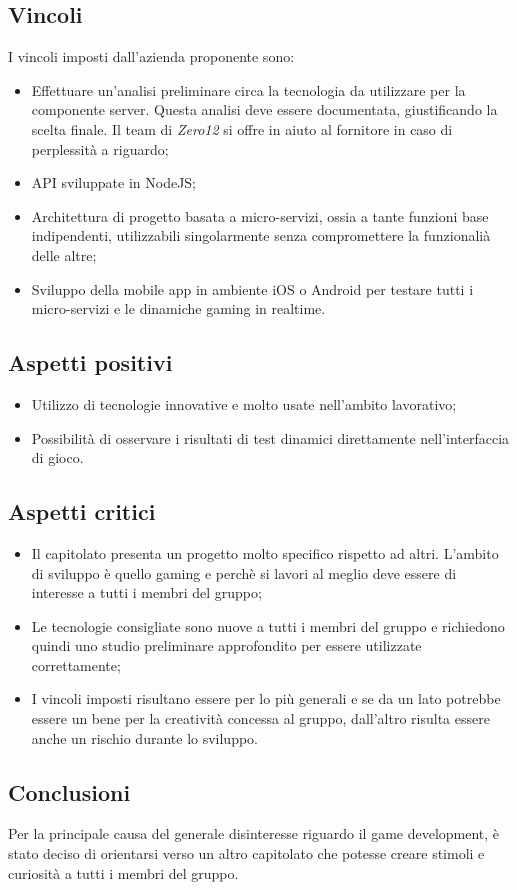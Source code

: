 \subsection{Vincoli}
I vincoli imposti dall'azienda proponente sono:
\begin{itemize}
\item Effettuare un'analisi preliminare circa la tecnologia da utilizzare per la componente server. Questa analisi deve essere documentata, giustificando la scelta finale. Il team di \textit{Zero12} si offre in aiuto al fornitore in caso di perplessità a riguardo;
\item API sviluppate in NodeJS;
\item Architettura di progetto basata a micro-servizi, ossia a tante funzioni base indipendenti, utilizzabili singolarmente senza compromettere la funzionalià delle altre;
\item Sviluppo della mobile app in ambiente iOS o Android per testare tutti i micro-servizi e le dinamiche gaming in realtime. 
\end{itemize}

\subsection{Aspetti positivi}
\begin{itemize}
\item Utilizzo di tecnologie innovative e molto usate nell'ambito lavorativo;
\item Possibilità di osservare i risultati di test dinamici direttamente nell'interfaccia di gioco.
\end{itemize}

\subsection{Aspetti critici}
\begin{itemize}
\item Il capitolato presenta un progetto molto specifico rispetto ad altri. L'ambito di sviluppo è quello gaming e perchè si lavori al meglio deve essere di interesse a tutti i membri del gruppo;
\item Le tecnologie consigliate sono nuove a tutti i membri del gruppo e richiedono quindi uno studio preliminare approfondito per essere utilizzate correttamente;
\item I vincoli imposti risultano essere per lo più generali e se da un lato potrebbe essere un bene per la creatività concessa al gruppo, dall'altro risulta essere anche un rischio durante lo sviluppo. 
\end{itemize}

\subsection{Conclusioni}
Per la principale causa del generale disinteresse riguardo il game development, è stato deciso di orientarsi verso un altro capitolato che potesse creare stimoli e curiosità a tutti i membri del gruppo.
